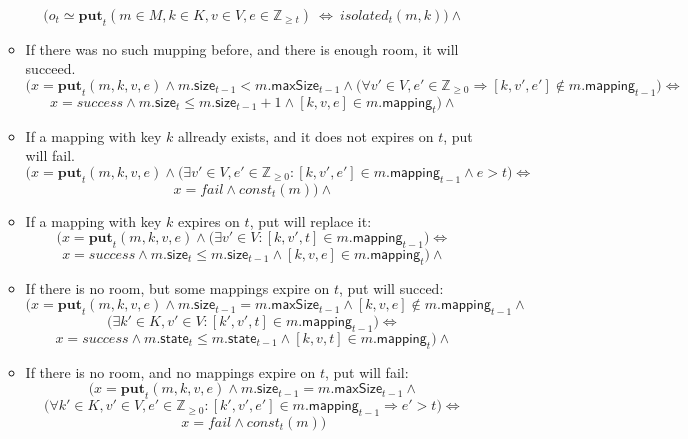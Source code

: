 \documentclass{article}
\renewcommand{\o}[1]{\ensuremath{\mathbf{#1}}}
\newcommand{\p}[1]{\ensuremath{\mathit{#1}}}
\newcommand{\s}[1]{\ensuremath{\mathsf{#1}}}
\newcommand{\nintset}{\ensuremath{\mathds{Z}_{\ge 0}}}
\newcommand{\moreset}[1]{\ensuremath{\mathds{Z}_{\ge #1}}}
\begin{document}
\begin{itemize}
\begin{itemize}
          $$\Big(o_t \simeq \o{put}_t(m\in M, k\in K, v\in V, e\in \moreset{t}) ~\Leftrightarrow~ \p{isolated}_t(m, k)\Big) \wedge$$
        \item If there was no such mupping before, and there is enough room, it will succeed.
          $$\Big(x=\o{put}_t(m, k, v, e) \wedge m.\s{size}_{t-1} < m.\s{maxSize}_{t-1} \wedge \big(\forall v'\in V, e'\in \nintset \Rightarrow [k, v', e'] \not\in m.\s{mapping}_{t-1}\big) \Leftrightarrow $$
          $$ x=success \wedge m.\s{size}_t \le m.\s{size}_{t-1}+1 \wedge [k, v, e] \in m.\s{mapping}_t\Big)\wedge$$
        \item If a mapping with key $k$ allready exists, and it does not expires on $t$, put will fail.
          $$\Big(x=\o{put}_t(m, k, v, e) \wedge \big(\exists v'\in V, e'\in \nintset: [k, v', e']\in m.\s{mapping}_{t-1} \wedge e > t \big) \Leftrightarrow$$
          $$x=fail \wedge \p{const}_t(m)\Big)\wedge$$
        \item If a mapping with key $k$ expires on $t$, put will replace it:
          $$\Big(x=\o{put}_t(m, k, v, e) \wedge \big(\exists v'\in V: [k, v', t]\in m.\s{mapping}_{t-1}\big) \Leftrightarrow$$
          $$ x=success \wedge m.\s{size}_t \le m.\s{size}_{t-1} \wedge [k, v, e] \in m.\s{mapping}_t\Big)\wedge$$
        \item If there is no room, but some mappings expire on $t$, put will succed:
          $$\Big(x=\o{put}_t(m, k, v, e) \wedge m.\s{size}_{t-1} = m.\s{maxSize}_{t-1} \wedge [k, v, e] \not\in m.\s{mapping}_{t-1} \wedge $$
          $$\big(\exists k'\in K, v'\in V: [k', v', t] \in m.\s{mapping}_{t-1}\big) \Leftrightarrow$$
          $$x=success \wedge m.\s{state}_t \le m.\s{state}_{t-1} \wedge [k, v, t] \in m.\s{mapping}_t\Big)\wedge$$
        \item If there is no room, and no mappings expire on $t$, put will fail:
          $$\Big(x=\o{put}_t(m, k, v, e) \wedge m.\s{size}_{t-1} = m.\s{maxSize}_{t-1} \wedge $$
          $$\big(\forall k'\in K, v'\in V, e' \in \nintset: [k', v', e'] \in m.\s{mapping}_{t-1} \Rightarrow e' > t \big) \Leftrightarrow$$
          $$x=fail \wedge \p{const}_t(m)\Big)$$



\end{itemize}
\end{itemize}
\end{document}
